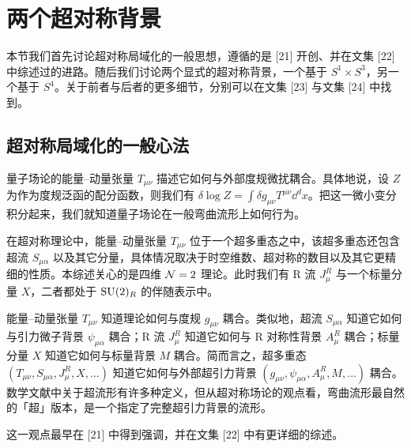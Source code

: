 
\section{两个超对称背景}

本节我们首先讨论超对称局域化的一般思想，遵循的是 [21] 开创、并在文集 [22] 中综述过的进路。随后我们讨论两个显式的超对称背景，一个基于 $S^1\times S^3$，另一个基于 $S^4$。关于前者与后者的更多细节，分别可以在文集 [23] 与文集 [24] 中找到。

\subsection{超对称局域化的一般心法}


量子场论的能量–动量张量 $T_{\mu\nu}$ 描述它如何与外部度规微扰耦合。具体地说，设 $Z$ 为作为度规泛函的配分函数，则我们有 $\delta\log Z=\int\delta g_{\mu\nu}T^{\mu\nu}\dd^d x$。把这一微小变分积分起来，我们就知道量子场论在一般弯曲流形上如何行为。

在超对称理论中，能量–动量张量 $T_{\mu\nu}$ 位于一个超多重态之中，该超多重态还包含超流 $S_{\mu\alpha}$ 以及其它分量，具体情况取决于时空维数、超对称的数目以及其它更精细的性质。本综述关心的是四维 $\mathcal{N}=2$ 理论。此时我们有 R 流 $J^R_\mu$ 与一个标量分量 $X$，二者都处于 $\mathrm{SU}(2)_R$ 的伴随表示中。

能量–动量张量 $T_{\mu\nu}$ 知道理论如何与度规 $g_{\mu\nu}$ 耦合。类似地，超流 $S_{\mu\alpha}$ 知道它如何与引力微子背景 $\psi_{\mu\alpha}$ 耦合；R 流 $J^R_\mu$ 知道它如何与 R 对称性背景 $A^R_\mu$ 耦合；标量分量 $X$ 知道它如何与标量背景 $M$ 耦合。简而言之，超多重态 $(T_{\mu\nu},S_{\mu\alpha},J^R_\mu,X,\ldots)$ 知道它如何与外部超引力背景 $(g_{\mu\nu},\psi_{\mu\alpha},A^R_\mu,M,\ldots)$ 耦合。数学文献中关于超流形有许多种定义，但从超对称场论的观点看，弯曲流形最自然的「超」版本，是一个指定了完整超引力背景的流形。

这一观点最早在 [21] 中得到强调，并在文集 [22] 中有更详细的综述。

